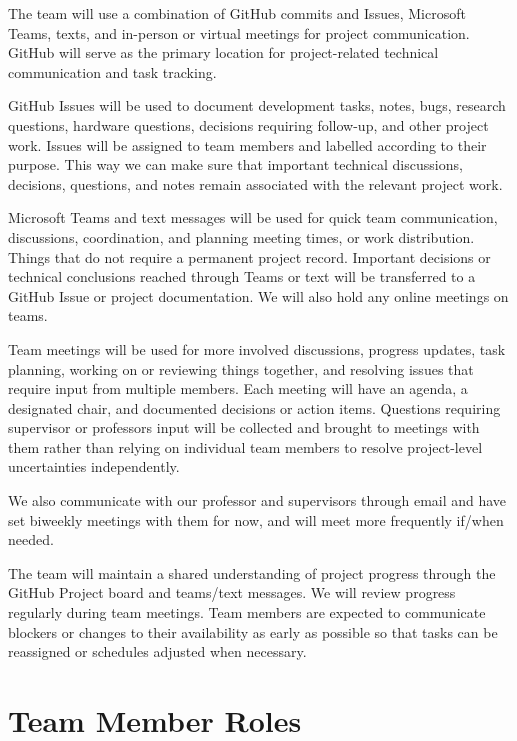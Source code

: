 \documentclass{article}
\begin{document}

The team will use a combination of GitHub commits and Issues, Microsoft Teams, texts, and in-person or virtual meetings for project communication. GitHub will serve as the primary location for project-related technical communication and task tracking.

GitHub Issues will be used to document development tasks, notes, bugs, research questions, hardware questions, decisions requiring follow-up, and other project work. Issues will be assigned to team members and labelled according to their purpose. This way we can make sure that important technical discussions, decisions, questions, and notes remain associated with the relevant project work.

Microsoft Teams and text messages will be used for quick team communication, discussions, coordination, and planning meeting times, or work distribution. Things that do not require a permanent project record. Important decisions or technical conclusions reached through Teams or text will be transferred to a GitHub Issue or project documentation. We will also hold any online meetings on teams.

Team meetings will be used for more involved discussions, progress updates, task planning, working on or reviewing things together, and resolving issues that require input from multiple members. Each meeting will have an agenda, a designated chair, and documented decisions or action items. Questions requiring supervisor or professors input will be collected and brought to meetings with them rather than relying on individual team members to resolve project-level uncertainties independently.

We also communicate with our professor and supervisors through email and have set biweekly meetings with them for now, and will meet more frequently if/when needed.

The team will maintain a shared understanding of project progress through the GitHub Project board and teams/text messages. We will review progress regularly during team meetings. Team members are expected to communicate blockers or changes to their availability as early as possible so that tasks can be reassigned or schedules adjusted when necessary.

\section{Team Member Roles}
\end{document}
